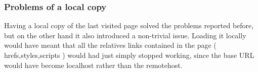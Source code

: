 \documentclass[11pt,a4paper]{article}
\begin{document}
\newpage

\subsubsection{Problems of a local copy}

Having a local copy of the last visited page solved the problems reported before, but on the other hand it also introduced a non-trivial issue. Loading it locally would have meant that all the relatives links contained in the page ( hrefs,styles,scripts ) would had just simply stopped working, since the base URL would have become localhost rather than the remotehost.\\
\end{document}
